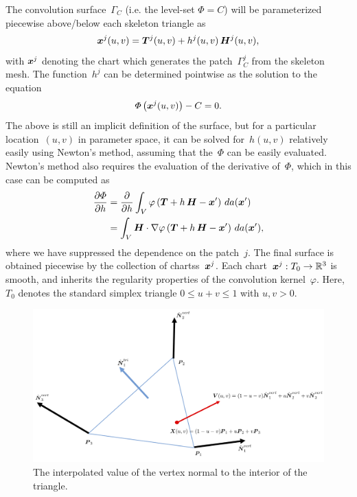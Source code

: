 \documentclass[11pt]{article}
\numberwithin{equation}{section}
\newcommand{\vct}{\vectorsym}
\newcommand{\lp}{\left(}
\newcommand{\rp}{\right)}
\newcommand\bbR{\mathbb R}
\newcommand\bx{\vct{x}}
\renewcommand{\phi}{\varphi}
\begin{document}
The convolution surface~$\Gamma_C$ (i.e. the level-set $\Phi = C$)
will be parameterized piecewise above/below each skeleton triangle as
\begin{equation}\label{eq:h}
  \vct{x}^j(u,v) = \vct{T}^j(u,v) + h^j(u,v) \, \vct{H}^j(u,v),
\end{equation}
with $\vct{x}^j$ denoting the chart which generates the patch~$\Gamma^j_C$
from the skeleton mesh. The function~$h^j$ can be determined
pointwise as the solution to the equation
\begin{equation}\label{eq:newton}
  \Phi\lp \vct{x}^j(u,v)  \rp - C = 0.
\end{equation}
The above is still an implicit definition of the surface, but for a
particular location~$(u,v)$ in parameter space, it can be solved
for~$h(u,v)$ relatively easily using Newton's method, assuming that
the~$\Phi$ can be easily evaluated. Newton's method also requires the
evaluation of the derivative of~$\Phi$, which in this case can be
computed as
\begin{equation}
  \begin{aligned}
  \frac{\partial \Phi}{\partial h} &= \frac{\partial }{\partial h}
  \int_V \phi\lp \vct{T} + h\, \vct{H} - \bx'\rp \, da(\vct{x}') \\
  &= \int_V \vct{H} \cdot \nabla \phi\lp
  \vct{T} + h\, \vct{H} - \bx'\rp \, da(\vct{x}'),
\end{aligned}
\end{equation}
where we have suppressed the dependence on the patch~$j$.  The final
surface is obtained piecewise by the collection of chartss~$\vct{x}^j$.
Each chart~$\vct{x}^j:T_0 \to \bbR^3$ is smooth, and inherits the
regularity properties of the convolution kernel~$\phi$. Here,~$T_0$
denotes the standard simplex triangle $0 \leq u+v \leq 1$ with
$u,v >0$.



\begin{figure}[t]
  \centering
  \includegraphics[width=.65\linewidth]{normal_vertex_3.png}%
  \caption{The interpolated value of the vertex normal to the interior
    of the triangle.}
  \label{normalvert3}
\end{figure}
\end{document}
